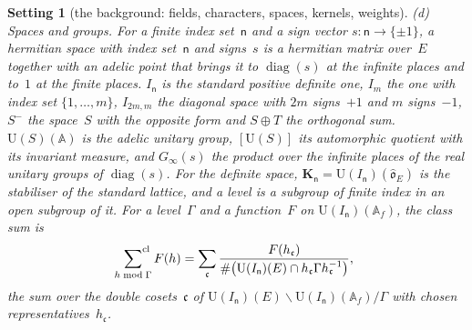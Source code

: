 \documentclass[11pt,a4paper]{article}
\newcommand{\kw}[1]{\emph{#1}}
\newcommand{\m}[1]{\mbox{$#1$}}        %
\theoremstyle{plainx}
\theoremstyle{uprightx}
\newtheorem{setting}[theorem]{Setting}          %
\newcommand{\AAA}{\mathbb{A}}
\newcommand{\ix}[1]{\mathsf{#1}}
\newcommand{\Ohat}{\widehat{\mathfrak{o}}_E}
\newcommand{\UU}{\mathrm{U}}
\newcommand{\KK}[1]{\mathbf{K}_{#1}}
\newcommand{\clsum}[2]{\sideset{}{^{\mathrm{cl}}}\sum_{#1\bmod #2}}
\begin{document}
\begin{setting}[the background: fields, characters, spaces, kernels, weights]
\emph{(d) Spaces and groups.} For a finite index set~$\ix n$ and a sign vector \m{s\colon\ix n\to\{\pm1\}}, a
\kw{hermitian space with index set~$\ix n$ and signs~$s$} is a hermitian matrix over~$E$ together with an adelic
point that brings it to \m{\operatorname{diag}(s)} at the infinite places and to~$1$ at the finite places. $I_{\ix n}$
is the standard positive definite one, $I_m$ the one with index set \m{\{1,\dots,m\}}, \m{I_{2m,m}} the diagonal
space with $2m$ signs~$+1$ and $m$ signs~$-1$, $S^{-}$ the space~$S$ with the opposite form and \m{S\oplus T} the
orthogonal sum. \m{\UU(S)(\AAA)} is the adelic unitary group, \m{[\UU(S)]} its automorphic quotient with its invariant
measure, and \m{G_\infty(s)} the product over the infinite places of the real unitary groups of \m{\operatorname{diag}(s)}.
For the definite space, \m{\KK{\ix n}=\UU(I_{\ix n})(\Ohat)} is the stabiliser of the standard lattice, and a
\kw{level} is a subgroup of finite index in an open subgroup of it. For a level~$\Gamma$ and a function~$F$ on
\m{\UU(I_{\ix n})(\AAA_f)}, the \kw{class sum} is
\[\clsum{h}{\Gamma}F(h)=\sum_{\mathfrak{c}}\frac{F(h_{\mathfrak{c}})}{\#\bigl(\UU(I_{\ix n})(E)\cap h_{\mathfrak{c}}\Gamma h_{\mathfrak{c}}^{-1}\bigr)},\]
the sum over the double cosets~$\mathfrak{c}$ of \m{\UU(I_{\ix n})(E)\backslash\UU(I_{\ix n})(\AAA_f)/\Gamma} with chosen
representatives~$h_{\mathfrak{c}}$.


\end{setting}
\end{document}
